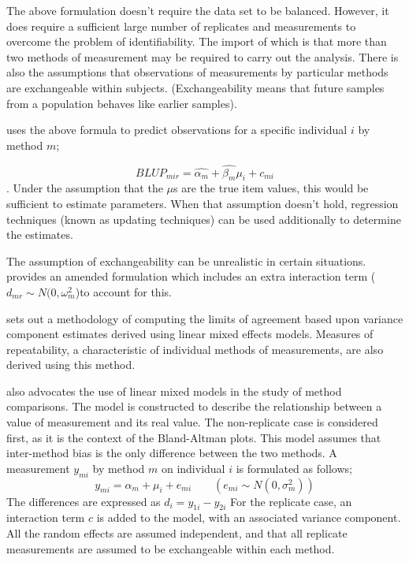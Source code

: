 \documentclass[12pt, a4paper]{report}
\theoremstyle{plain}
\theoremstyle{definition}
\theoremstyle{remark}
\begin{document}
The above formulation doesn't require the data set to be balanced.
However, it does require a sufficient large number of replicates
and measurements to overcome the problem of identifiability. The
import of which is that more than two methods of measurement may
be required to carry out the analysis. There is also the
assumptions that observations of measurements by particular
methods are exchangeable within subjects. (Exchangeability means
that future samples from a population behaves like earlier
samples).



\citet{BXC2004} uses the above formula to predict observations for
a specific individual $i$ by method $m$;

\begin{equation}BLUP_{mir} = \hat{\alpha_{m}} + \hat{\beta_{m}}\mu_{i} +
c_{mi} \end{equation}. Under the assumption that the $\mu$s are
the true item values, this would be sufficient to estimate
parameters. When that assumption doesn't hold, regression
techniques (known as updating techniques) can be used additionally
to determine the estimates. 

The assumption of exchangeability can
be unrealistic in certain situations. \citet{BXC2004} provides an
amended formulation which includes an extra interaction term ($
d_{mr} \sim N(0,\omega^{2}_{m}$)to account for this.

\citet{BXC2008} sets out a methodology of computing the limits of
agreement based upon variance component estimates derived using
linear mixed effects models. Measures of repeatability, a
characteristic of individual methods of measurements, are also
derived using this method.

\citet{BXC2004} also advocates the use of linear mixed models in
the study of method comparisons. The model is constructed to
describe the relationship between a value of measurement and its
real value. The non-replicate case is considered first, as it is
the context of the Bland-Altman plots. This model assumes that
inter-method bias is the only difference between the two methods.
A measurement $y_{mi}$ by method $m$ on individual $i$ is
formulated as follows;
\begin{equation}
y_{mi}  = \alpha_{m} + \mu_{i} + e_{mi} \qquad ( e_{mi} \sim
N(0,\sigma^{2}_{m}))
\end{equation}
The differences are expressed as $d_{i} = y_{1i} - y_{2i}$ For the
replicate case, an interaction term $c$ is added to the model,
with an associated variance component. All the random effects are
assumed independent, and that all replicate measurements are
assumed to be exchangeable within each method.
\end{document}
